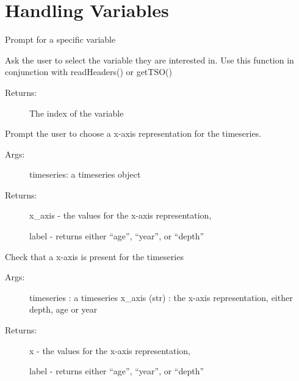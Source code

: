 \documentclass[letterpaper,10pt,english]{sphinxmanual}
\begin{document}
\section{Handling Variables}
\label{\detokenize{LipdUtils:handling-variables}}

\begin{fulllineitems}
\label{\detokenize{LipdUtils:pyleoclim.LipdUtils.promptForVariable}}
Prompt for a specific variable

Ask the user to select the variable they are interested in.
Use this function in conjunction with readHeaders() or getTSO()
\begin{description}
\item[{Returns:}] \leavevmode
The index of the variable

\end{description}

\end{fulllineitems}


\begin{fulllineitems}
\label{\detokenize{LipdUtils:pyleoclim.LipdUtils.xAxisTs}}
Prompt the user to choose a x-axis representation for the timeseries.
\begin{description}
\item[{Args:}] \leavevmode
timeseries: a timeseries object

\item[{Returns:}] \leavevmode
x\_axis - the values for the x-axis representation,

label - returns either “age”, “year”, or “depth”

\end{description}

\end{fulllineitems}


\begin{fulllineitems}
\label{\detokenize{LipdUtils:pyleoclim.LipdUtils.checkXaxis}}
Check that a x-axis is present for the timeseries
\begin{description}
\item[{Args:}] \leavevmode
timeseries : a timeseries
x\_axis (str) : the x-axis representation, either depth, age or year

\item[{Returns:}] \leavevmode
x - the values for the x-axis representation,

label - returns either “age”, “year”, or “depth”

\end{description}

\end{fulllineitems}
\end{document}
